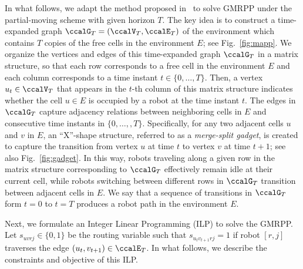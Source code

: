 \documentclass[Afour,sageh,times]{sagej}
\begin{document}
{{{  In what follows, we adapt the method proposed in~\cite{yu2016optimal} to solve GMRPP under the partial-moving scheme with given horizon $T$.  The key idea is to construct a time-expanded graph $\ccalG_T = (\ccalV_T, \ccalE_T)$ of the environment which contains $T$ copies of the free cells in the environment $E$; see Fig.~\ref{fig:mapp}. We organize the vertices and edges of this time-expanded graph $\ccalG_T$ in a matrix structure, so that each row corresponds to a free cell in the environment $E$ and each column corresponds to a time instant $t\in \{0,\ldots,T\}$. Then, a vertex $u_t \in \ccalV_T$ that appears in the $t$-th column of this matrix structure indicates whether the cell $u\in E$ is occupied by a robot at the time instant $t$. The edges in $\ccalG_T$ capture  adjacency relations between neighboring cells in $E$ and consecutive time instants in $\{0,\ldots,,T\}$. Specifically, for any two adjacent cells $u$ and $v$ in $E$, an ``X''-shape structure, referred to as a {\it merge-split gadget}, is created to capture the transition from vertex $u$ at time $t$ to vertex $v$ at time $t+1$; see also Fig.~\ref{fig:gadget}. In this way, robots traveling along a given row in the matrix structure corresponding to $\ccalG_T$ effectively remain idle at their current cell, while robots switching between different rows in $\ccalG_T$ transition between adjacent cells in $E$. We say that a sequence of transitions in $\ccalG_T$ form $t=0$ to $t=T$ produces a robot path in the environment $E$.

Next, we formulate an Integer Linear Programming (ILP) to solve the GMRPP. Let $s_{uvrj} \in\{0,1\}$ be the routing variable such that $s_{u_{t}v_{t+1}rj} = 1$ if robot $[r,j]$ traverses the edge $(u_t,v_{t+1}) \in \ccalE_T$. In what follows, we describe the constraints and objective of this ILP.


}}}
\end{document}
